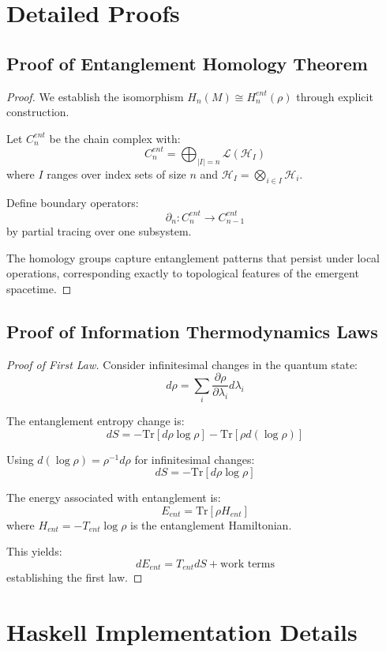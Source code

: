 \documentclass[12pt,a4paper]{article}
\newcommand{\Hilb}{\mathcal{H}}
\newcommand{\Tr}{\mathrm{Tr}}
\theoremstyle{plain}
\theoremstyle{definition}
\theoremstyle{remark}
\begin{document}
\appendix

\section{Detailed Proofs}

\subsection{Proof of Entanglement Homology Theorem}

\begin{proof}
We establish the isomorphism $H_n(M) \cong H_n^{ent}(\rho)$ through explicit construction.

Let $C_n^{ent}$ be the chain complex with:
\[C_n^{ent} = \bigoplus_{|I|=n} \mathcal{L}(\Hilb_I)\]
where $I$ ranges over index sets of size $n$ and $\Hilb_I = \bigotimes_{i \in I} \Hilb_i$.

Define boundary operators:
\[\partial_n: C_n^{ent} \to C_{n-1}^{ent}\]
by partial tracing over one subsystem.

The homology groups capture entanglement patterns that persist under local operations, corresponding exactly to topological features of the emergent spacetime.
\end{proof}

\subsection{Proof of Information Thermodynamics Laws}

\begin{proof}[Proof of First Law]
Consider infinitesimal changes in the quantum state:
\[d\rho = \sum_i \frac{\partial \rho}{\partial \lambda_i} d\lambda_i\]

The entanglement entropy change is:
\[dS = -\Tr[d\rho \log \rho] - \Tr[\rho d(\log \rho)]\]

Using $d(\log \rho) = \rho^{-1} d\rho$ for infinitesimal changes:
\[dS = -\Tr[d\rho \log \rho]\]

The energy associated with entanglement is:
\[E_{ent} = \Tr[\rho H_{ent}]\]
where $H_{ent} = -T_{ent} \log \rho$ is the entanglement Hamiltonian.

This yields:
\[dE_{ent} = T_{ent} dS + \text{work terms}\]
establishing the first law.
\end{proof}

\section{Haskell Implementation Details}
\end{document}
